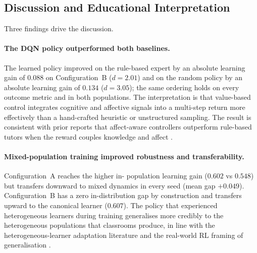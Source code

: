 \subsection{Discussion and Educational Interpretation}\label{sec:results_adapt_discussion}

Three findings drive the discussion.

\paragraph{The \ac{DQN} policy outperformed both baselines.} The
learned policy improved on the rule-based expert by an absolute
learning gain of $0.088$ on Configuration~B ($d=2.01$) and on
the random policy by an absolute learning gain of $0.134$
($d=3.05$); the same ordering holds on every outcome metric
and in both populations. The interpretation is that
value-based control integrates cognitive and affective signals
into a multi-step return more effectively than a hand-crafted
heuristic or unstructured sampling. The result is consistent
with prior reports that affect-aware controllers outperform
rule-based tutors when the reward couples knowledge and affect
\cite{sayed_ai-based_2023,
Prabakaran2025FacialExpressionAdaptiveTeaching}.

\paragraph{Mixed-population training improved robustness and
transferability.} Configuration~A reaches the higher in-
population learning gain ($0.602$ vs $0.548$) but transfers
downward to mixed dynamics in every seed (mean gap $+0.049$).
Configuration~B has a zero in-distribution gap by construction
and transfers upward to the canonical learner ($0.607$). The
policy that experienced heterogeneous learners during training
generalises more credibly to the heterogeneous populations that
classrooms produce, in line with the heterogeneous-learner
adaptation literature
\cite{ihichr_systematic_2024,zerkouk_comprehensive_2025} and the
real-world \ac{RL} framing of generalisation
\cite{dulacarnold_challenges_2021}.

